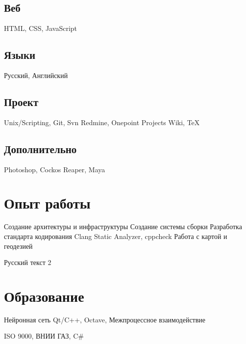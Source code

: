 \documentclass[a4paper]{curricula-vitae}
\begin{document}
\begin{minipage}[t]{0.33\textwidth}
\subsection{Веб}
HTML, CSS, JavaScript

\subsection{Языки}
Русский, Английский

\subsection{Проект}
Unix/Scripting, Git, Svn
Redmine, Onepoint Projects
Wiki, TeX

\subsection{Дополнительно}
Photoshop, 
Cockos Reaper, 
Maya

\end{minipage} %
\hfill
\begin{minipage}[t]{0.66\textwidth} %

\section{Опыт работы} 

Создание архитектуры и инфраструктуры
Создание системы сборки
Разработка стандарта кодирования
Clang Static Analyzer, cppcheck
Работа с картой и геодезией

Русский текст 2

\section{Образование} 

Нейронная сеть Qt/C++, Octave, Межпроцессное взаимодействие

ISO 9000, ВНИИ ГАЗ, C\#

\end{minipage} %

\end{document}
